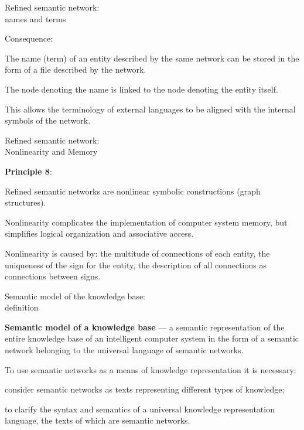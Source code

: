 \begin{frame}{Refined semantic network:\\names and terms}
	\topline
	\justifying
	
	Consequence:
	\begin{textitemize}
		\item The name (term) of an entity described by the same network can be stored in the form of a file described by the network.
		\item The node denoting the name is linked to the node denoting the entity itself.
		\item This allows the terminology of external languages to be aligned with the internal symbols of the network.
	\end{textitemize}
	
\end{frame}


\begin{frame}{Refined semantic network:\\Nonlinearity and Memory}
	\topline
	\justifying
	
	\textbf{Principle 8}:
	\begin{textitemize}
		\item Refined semantic networks are nonlinear symbolic constructions (graph structures).
		\item Nonlinearity complicates the implementation of computer system memory, but simplifies logical organization and associative access.
	\end{textitemize}
	
	\medskip
	Nonlinearity is caused by: the multitude of connections of each entity, the uniqueness of the sign for the entity, the description of all connections as connections between signs.
	
\end{frame}


\begin{frame}{Semantic model of the knowledge base:\\definition}
	\topline
	\justifying
	
	\textbf{Semantic model of a knowledge base} --- a semantic representation of the entire knowledge base of an intelligent computer system in the form of a semantic network belonging to the universal language of semantic networks.
	
	\medskip
	To use semantic networks as a means of knowledge representation it is necessary:
	\begin{textitemize}
		\item consider semantic networks as texts representing different types of knowledge;
		\item to clarify the syntax and semantics of a universal knowledge representation language, the texts of which are semantic networks.
	\end{textitemize}
	
\end{frame}


